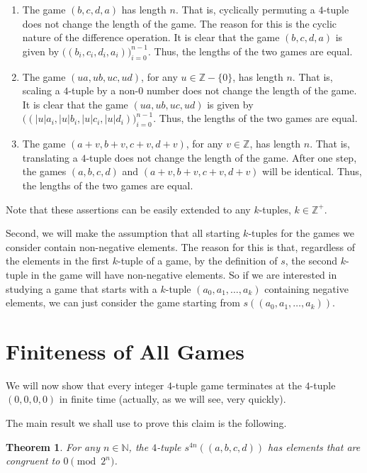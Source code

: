 \documentclass[12pt]{amsart}
\newtheorem{theorem}{Theorem}[section]
\newcommand{\z}{\mathbb{Z}}
\newcommand{\diff}{s}
\newcommand{\znn}{\mathbb{N}}
\newcommand{\zp}{\mathbb{Z}^+}
\begin{document}
\begin{enumerate}
\item The game $(b,c,d,a)$ has length $n$. That is, cyclically permuting a $4$-tuple does not change the length of the game. The reason for this is the cyclic nature of the difference operation. It is clear that the game $(b,c,d,a)$ is given by $\Big((b_i, c_i, d_i, a_i)\Big)_{i=0}^{n - 1}$. Thus, the lengths of the two games are equal. \\
\item The game $(ua, ub, uc, ud)$, for any $u \in \z - \{0\}$, has length $n$. That is, scaling a $4$-tuple by a non-$0$ number does not change the length of the game. It is clear that the game $(ua, ub, uc, ud)$ is given by $\Big((|u|a_i, |u|b_i, |u|c_i, |u|d_i)\Big)_{i=0}^{n - 1}$. Thus, the lengths of the two games are equal. \\
\item The game $(a + v, b + v, c + v, d + v)$, for any $v \in \z$, has length $n$. That is, translating a $4$-tuple does not change the length of the game. After one step, the games $(a, b, c, d)$ and $(a + v, b + v, c + v, d + v)$ will be identical. Thus, the lengths of the two games are equal.
\end{enumerate}

Note that these assertions can be easily extended to any $k$-tuples, $k \in \zp$.

Second, we will make the assumption that all starting $k$-tuples for the games we consider contain non-negative elements. The reason for this is that, regardless of the elements in the first $k$-tuple of a game, by the definition of $\diff$, the second $k$-tuple in the game will have non-negative elements. So if we are interested in studying a game that starts with a $k$-tuple $(a_0, a_1, \dots, a_k)$ containing negative elements, we can just consider the game starting from $\diff((a_0, a_1, \dots, a_k))$.

\section{Finiteness of All Games\label{sec:convergence}}

We will now show that every integer $4$-tuple game terminates at the $4$-tuple $(0,0,0,0)$ in finite time (actually, as we will see, very quickly).

The main result we shall use to prove this claim is the following.
\begin{theorem}
For any $n \in \znn$, the $4$-tuple $\diff^{4n}((a, b, c, d))$ has elements that are congruent to $0\pmod{2^n}$.
\label{thm:pow2}
\end{theorem}
\end{document}
